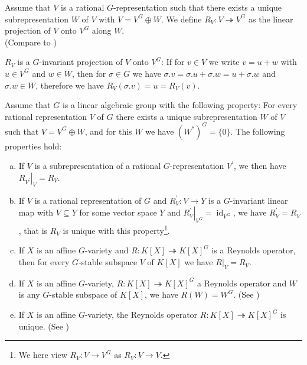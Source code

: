 \begin{definition}
  Assume that $V$ is a rational $G$-representation such that there exists a unique subrepresentation $W$ of $V$ with $V = V^G \oplus W$.
  We define $R_V \colon V \twoheadrightarrow V^G$ as the linear projection of $V$ onto $V^G$ along $W$.  \\
  (Compare to \cite[2.2.5 (b)$\implies$(c)]{DK15})
\end{definition}

\begin{remark}
  $R_V$ is a $G$-invariant projection of $V$ onto $V^G$:
  If for $v \in V$ we write $v = u + w$ with $u \in V^G$ and $w \in W$, then for $\sigma \in G$ we have $\sigma.v = \sigma.u + \sigma.w = u + \sigma.w$ and $\sigma.w \in W$, therefore we have $R_V(\sigma.v) = u = R_V(v)$.
\end{remark}

\begin{lemma}\label{lamm}
  Assume that $G$ is a linear algebraic group with the following property:
  For every rational representation $V$ of $G$ there exists a unique subrepresentation $W$ of $V$ such that $V = V^G \oplus W$, and for this $W$ we have $(W^\ast)^G = \{0\}$.
  The following properties hold:
  \begin{enumerate}[(a)]
  \item If $V$ is a subrepresentation of a rational $G$-representation $V^\prime$, we then have $\left. R_{V^\prime} \right|_V = R_V$.
  \item If $V$ is a rational representation of $G$ and $R^\prime_V \colon V \rightarrow Y$ is a $G$-invariant linear map with $V \subseteq Y$ for some vector space $Y$ and $ \left. R^\prime_V \right|_{V^G} = \operatorname{id}_{V^G}$, we have $R^\prime_V = R_V$, that is $R_V$ is unique with this property\footnote{We here view $R_V \colon V \rightarrow V^G$ as $R_V \colon V \rightarrow V$.}.
  \item If $X$ is an affine $G$-variety and $R \colon K[X] \twoheadrightarrow K[X]^G$ is a Reynolds operator, then for every $G$-stable subspace $V$ of $K[X]$ we have $\left. R \right|_V = R_V$.
  \item If $X$ is an affine $G$-variety, $R \colon K[X] \twoheadrightarrow K[X]^G$ a Reynolds operator and $W$ is any $G$-stable subspace of $K[X]$, we have $R(W) = W^G$.  (See \cite[2.2.7]{DK15})
  \item If $X$ is an affine $G$-variety, the Reynolds operator $R\colon K[X] \twoheadrightarrow K[X]^G$ is unique.  (See \cite[2.2.5 (b)$\implies$(c)]{DK15})
  \end{enumerate}
\end{lemma}

